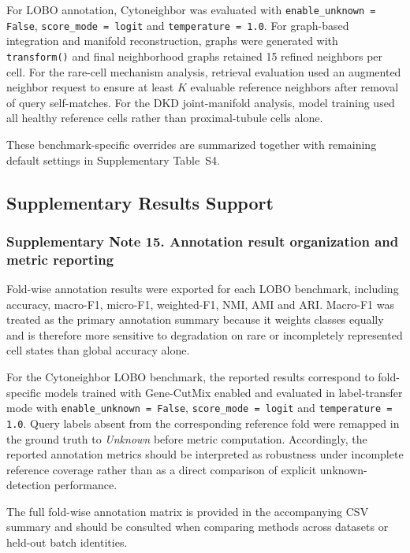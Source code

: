 \documentclass[11pt]{article}
\begin{document}
For LOBO annotation, Cytoneighbor was evaluated with \texttt{enable\_unknown = False}, \texttt{score\_mode = logit} and \texttt{temperature = 1.0}. For graph-based integration and manifold reconstruction, graphs were generated with \texttt{transform()} and final neighborhood graphs retained 15 refined neighbors per cell. For the rare-cell mechanism analysis, retrieval evaluation used an augmented neighbor request to ensure at least $K$ evaluable reference neighbors after removal of query self-matches. For the DKD joint-manifold analysis, model training used all healthy reference cells rather than proximal-tubule cells alone.

These benchmark-specific overrides are summarized together with remaining default settings in Supplementary Table~S4.

\subsection*{Supplementary Results Support}

\subsubsection*{Supplementary Note 15. Annotation result organization and metric reporting}

Fold-wise annotation results were exported for each LOBO benchmark, including accuracy, macro-F1, micro-F1, weighted-F1, NMI, AMI and ARI. Macro-F1 was treated as the primary annotation summary because it weights classes equally and is therefore more sensitive to degradation on rare or incompletely represented cell states than global accuracy alone.

For the Cytoneighbor LOBO benchmark, the reported results correspond to fold-specific models trained with Gene-CutMix enabled and evaluated in label-transfer mode with \texttt{enable\_unknown = False}, \texttt{score\_mode = logit} and \texttt{temperature = 1.0}. Query labels absent from the corresponding reference fold were remapped in the ground truth to \textit{Unknown} before metric computation. Accordingly, the reported annotation metrics should be interpreted as robustness under incomplete reference coverage rather than as a direct comparison of explicit unknown-detection performance.

The full fold-wise annotation matrix is provided in the accompanying CSV summary and should be consulted when comparing methods across datasets or held-out batch identities.
\end{document}

